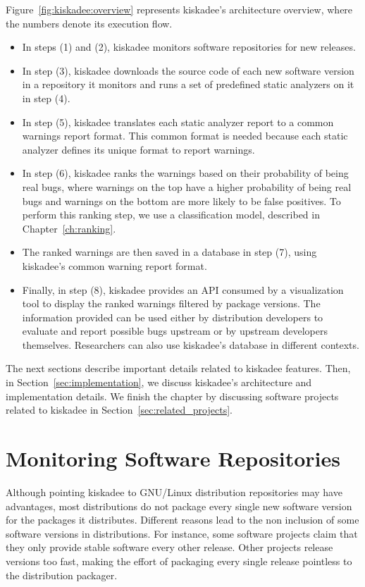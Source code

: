 Figure~\ref{fig:kiskadee:overview} represents kiskadee's architecture overview,
where the numbers denote its execution flow.
\begin{itemize}
  \item In steps (1) and (2), kiskadee
monitors software repositories for new releases.
    \item In step (3), kiskadee
downloads the source code of each new software version in a repository it
monitors and runs a set of predefined static analyzers on it in step (4).
    \item In step (5),
kiskadee translates each static analyzer report to a common warnings report format.
This common format is needed because each static analyzer defines
its unique format to report warnings.
    \item In step (6), kiskadee ranks the warnings
based on their probability of being real bugs, where warnings on the top have a
higher probability of being real bugs and warnings on the bottom are more
likely to be false positives. To perform this ranking step, we use a
classification model, described in Chapter~\ref{ch:ranking}.
    \item The ranked
warnings are then saved in a database in step (7), using kiskadee's common
warning report format.  
    \item Finally, in step (8), kiskadee provides an API consumed
by a visualization tool to display the ranked warnings filtered by package
versions. The information provided can be used either by distribution developers to
evaluate and report possible bugs upstream or by upstream developers
themselves. Researchers can also use kiskadee's database in different contexts.
\end{itemize}

The next sections describe important details related to
kiskadee features. Then, in Section~\ref{sec:implementation}, we discuss
kiskadee's architecture and implementation details. We finish the chapter by discussing software projects related to kiskadee in Section~\ref{sec:related_projects}.

\section{Monitoring Software Repositories}
\label{sec:monitoring}

Although pointing kiskadee to GNU/Linux distribution repositories may have
advantages, most distributions do not package every single new software version
for the packages it distributes. Different reasons lead to the non inclusion of
some software versions in distributions. For instance, some software projects
claim that they only provide stable software every other release.  Other
projects release versions too fast, making the effort of packaging every single
release pointless to the distribution packager.

